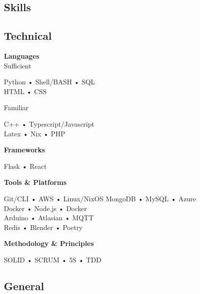 \documentclass[11pt, twoside, a4paper, titlepage]{article}
\begin{document}
\begin{tcolorbox}[boxsep=0mm, left=0mm, right=0mm, top=0mm, bottom=0mm, height=23cm]
	\begin{minipage}[t]{6.01cm}
		\begin{tcolorbox}[colframe=black, colback=black, arc=0mm, sharp corners, fontupper=\color{white}, height=22.9cm]
			\section*{Skills}
			
			\subsection*{Technical}
			\textbf{Languages}\\
			\large{Sufficient}\\
			\small
			\parbox{5cm}{Python • Shell/BASH • SQL \\ HTML • CSS }
			
			\vspace*{0.2cm}
			
			\large{Familiar}\\
			\small
			\parbox{5cm}{C++ • Typescript/Javascript \\ Latex • Nix • PHP }
			
			\vspace*{0.4cm}
			
			\textbf{Frameworks}\\
			\parbox{5cm}{Flask • React}
			
			\vspace*{0.4cm}
			
			\textbf{Tools \& Platforms}\\
			\parbox{5cm}{Git/CLI • AWS • Linux/NixOS  MongoDB • MySQL • Azure \\ Docker • Node.js • Docker \\ Arduino • Atlasian • MQTT \\ Redis • Blender • Poetry }
			
			\vspace*{0.4cm}
			
			\textbf{Methodology \& Principles}\\
			\parbox{5cm}{SOLID • SCRUM • 5S • TDD }
			
			\subsection*{General}
			

\end{tcolorbox}
\end{minipage}
\end{tcolorbox}
\end{document}
